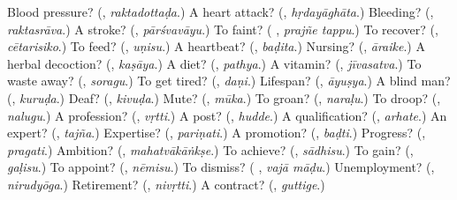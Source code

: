 \begin{tcolorbox}[breakable,colback=teal!4,colframe=teal!35!black,title={Before you move on}]
Blood pressure? (\textbf{}, \emph{raktadottaḍa}.) A heart attack? (\textbf{}, \emph{hṛdayāghāta}.) Bleeding? (\textbf{}, \emph{raktasrāva}.) A stroke? (\textbf{}, \emph{pārśvavāyu}.) To faint? (\textbf{ }, \emph{prajñe tappu}.) To recover? (\textbf{}, \emph{cētarisiko}.) To feed? (\textbf{}, \emph{uṇisu}.) A heartbeat? (\textbf{}, \emph{baḍita}.) Nursing? (\textbf{}, \emph{āraike}.) A herbal decoction? (\textbf{}, \emph{kaṣāya}.) A diet? (\textbf{}, \emph{pathya}.) A vitamin? (\textbf{}, \emph{jīvasatva}.) To waste away? (\textbf{}, \emph{soragu}.) To get tired? (\textbf{}, \emph{daṇi}.) Lifespan? (\textbf{}, \emph{āyuṣya}.) A blind man? (\textbf{}, \emph{kuruḍa}.) Deaf? (\textbf{}, \emph{kivuḍa}.) Mute? (\textbf{}, \emph{mūka}.) To groan? (\textbf{}, \emph{naraḷu}.) To droop? (\textbf{}, \emph{nalugu}.) A profession? (\textbf{}, \emph{vṛtti}.) A post? (\textbf{}, \emph{hudde}.) A qualification? (\textbf{}, \emph{arhate}.) An expert? (\textbf{}, \emph{tajña}.) Expertise? (\textbf{}, \emph{pariṇati}.) A promotion? (\textbf{}, \emph{baḍti}.) Progress? (\textbf{}, \emph{pragati}.) Ambition? (\textbf{}, \emph{mahatvākāṅkṣe}.) To achieve? (\textbf{}, \emph{sādhisu}.) To gain? (\textbf{}, \emph{gaḷisu}.) To appoint? (\textbf{}, \emph{nēmisu}.) To dismiss? (\textbf{ }, \emph{vajā māḍu}.) Unemployment? (\textbf{}, \emph{nirudyōga}.) Retirement? (\textbf{}, \emph{nivṛtti}.) A contract? (\textbf{}, \emph{guttige}.)
\end{tcolorbox}
